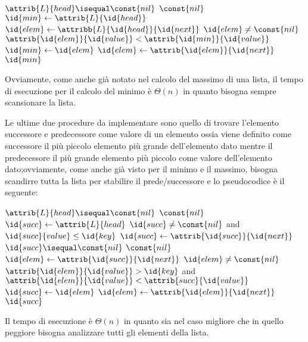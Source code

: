 \begin{codebox}
\li \If $\attrib{L}{head} \isequal \const{nil}$
    \Then
\li                \Return $\const{nil}$
\li $\id{min} \gets \attrib{L}{\id{head}}$
\li $\id{elem} \gets \attribb{L}{\id{head}}{\id{next}}$
\li \While $\id{elem} \neq \const{nil}$
    \Do
\li                 \If $\attrib{\id{elem}}{\id{value}} < \attrib{\id{min}}{\id{value}}$
                    \Then
\li                              $\id{min} \gets \id{elem}$
                    \End
\li                 $\id{elem} \gets \attrib{\id{elem}}{\id{next}}$
    \End
\li \Return $\id{min}$
\end{codebox}
Ovviamente, come anche già notato nel calcolo del massimo di una lista, il tempo di
esecuzione per il calcolo del minimo è $\Theta(n)$ in quanto bisogna sempre scansionare la lista.

Le ultime due procedure da implementare sono quello di trovare l'elemento successore
e predecessore come valore di un elemento ossia viene definito come successore il più
piccolo elemento più grande dell'elemento dato mentre il predecessore il più grande
elemento più piccolo come valore dell'elemento dato;ovviamente, come anche già visto
per il minimo e il massimo, bisogna scandirre tutta la lista per stabilire il prede/successore
e lo pseudocodice è il seguente:
\begin{codebox}
\li \If $\attrib{L}{head} \isequal \const{nil}$
    \Then
\li                \Return $\const{nil}$
\li $\id{succ} \gets \attrib{L}{head}$
\li \While $\id{succ} \neq \const{nil}$ and $\id{succ}{value} \leq \id{key}$
    \Do
\li           $\id{succ} \gets \attrib{\id{succ}}{\id{next}}$
    \End
\li \If $\id{succ} \isequal \const{nil}$ \Return $\const{nil}$
\li $\id{elem} \gets \attrib{\id{succ}}{\id{next}}$
\li \While $\id{elem} \neq \const{nil}$
    \Do
\li      \If $\attrib{\id{elem}}{\id{value}} > \id{key}$ and $\attrib{\id{elem}}{\id{value}} < \attrib{succ}{\id{value}}$
         \Then
\li                              $\id{succ} \gets \id{elem}$
         \End
\li      $\id{elem} \gets \attrib{\id{elem}}{\id{next}}$
    \End
\li \Return $\id{succ}$
\end{codebox}
Il tempo di esecuzione è $\Theta(n)$ in quanto sia nel caso migliore che in quello
peggiore bisogna analizzare tutti gli elementi della lista.

